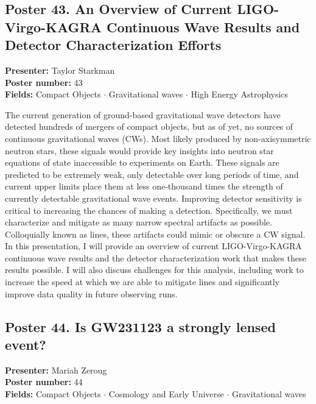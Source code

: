 \hypertarget{poster-abstract-talk-249}{}\label{poster-abstract-page-talk-249}
\subsection*{Poster 43. An Overview of Current LIGO-Virgo-KAGRA Continuous Wave Results and Detector Characterization Efforts}
\textbf{Presenter:} Taylor Starkman\\
\textbf{Poster number:} 43\\
\textbf{Fields:} Compact Objects $\cdot$ Gravitational waves $\cdot$ High Energy Astrophysics

The current generation of ground-based gravitational wave detectors have detected hundreds of mergers of compact objects, but as of yet, no sources of continuous gravitational waves (CWs). Most likely produced by non-axisymmetric neutron stars, these signals would provide key insights into neutron star equations of state inaccessible to experiments on Earth. These signals are predicted to be extremely weak, only detectable over long periods of time, and current upper limits place them at less one-thousand times the strength of currently detectable gravitational wave events. Improving detector sensitivity is critical to increasing the chances of making a detection. Specifically, we must characterize and mitigate as many narrow spectral artifacts as possible. Colloquially known as lines, these artifacts could mimic or obscure a CW signal. In this presentation, I will provide an overview of current LIGO-Virgo-KAGRA continuous wave results and the detector characterization work that makes these results possible. I will also discuss challenges for this analysis, including work to increase the speed at which we are able to mitigate lines and significantly improve data quality in future observing runs.

\hypertarget{poster-abstract-talk-296}{}\label{poster-abstract-page-talk-296}
\subsection*{Poster 44. Is GW231123 a strongly lensed event?}
\textbf{Presenter:} Mariah Zeroug\\
\textbf{Poster number:} 44\\
\textbf{Fields:} Compact Objects $\cdot$ Cosmology and Early Universe $\cdot$ Gravitational waves


